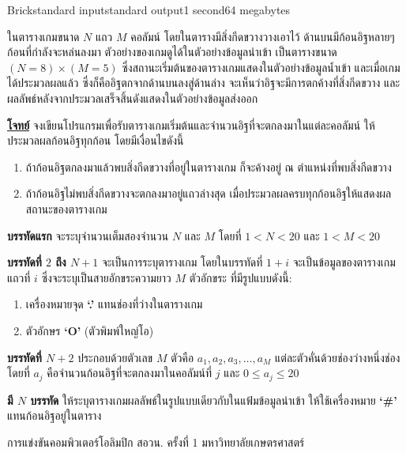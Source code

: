\documentclass[11pt,a4paper]{article}
\begin{document}
\begin{problem}{Brick}{standard input}{standard output}{1 second}{64 megabytes}

ในตารางเกมขนาด $N$ แถว $M$ คอลัมน์ โดยในตารางมีสิ่งกีดขวางวางเอาไว้ ด้านบนมีก้อนอิฐหลายๆ ก้อนที่กำลังจะหล่นลงมา ตัวอย่างของเกมดูได้ในตัวอย่างข้อมูลนำเข้า เป็นตารางขนาด $(N=8)\times (M=5)$ ซึ่งสถานะเริ่มต้นของตารางเกมแสดงในตัวอย่างข้อมูลน้ำเข้า และเมื่อเกมได้ประมวลผลแล้ว ซึ่งก็คืออิฐตกจากด้านบนลงสู่ด้านล่าง จะเห็นว่าอิฐจะมีการตกค้างที่สิ่งกีดขวาง และผลลัพธ์หลังจากประมวลเสร็จสิ้นดังแสดงในตัวอย่างข้อมูลส่งออก


\underline{\textbf{โจทย์}} จงเขียนโปรแกรมเพื่อรับตารางเกมเริ่มต้นและจำนวนอิฐที่จะตกลงมาในแต่ละคอลัมน์ ให้ประมวลผลก้อนอิฐทุกก้อน โดยมีเงื่อนไขดังนี้
\begin{enumerate}
\item  ถ้าก้อนอิฐตกลงมาแล้วพบสิ่งกีดขวางที่อยู่ในตารางเกม ก็จะค้างอยู่ ณ ตำแหน่งที่พบสิ่งกีดขวาง
\item ถ้าก้อนอิฐไม่พบสิ่งกีดขวางจะตกลงมาอยู่แถวล่างสุด เมื่อประมวลผลครบทุกก้อนอิฐให้แสดงผลสถานะของตารางเกม 
\end{enumerate}

\InputFile
\textbf{บรรทัดแรก} จะระบุจำนวนเต็มสองจำนวน $N$ และ $M$ โดยที่ $1 < N < 20$ และ $1 < M < 20$

\textbf{บรรทัดที่ $2$ ถึง $N+1$} จะเป็นการระบุตารางเกม โดยในบรรทัดที่ $1 + i$ จะเป็นข้อมูลของตารางเกมแถวที่ $i$ ซึ่งจะระบุเป็นสายอักขระความยาว $M$ ตัวอักขระ ที่มีรูปแบบดังนี้:
\begin{enumerate}

\item เครื่องหมายจุด \textbf{‘.’} แทนช่องที่ว่างในตารางเกม 
\item ตัวอักษร \textbf{‘O’} (ตัวพิมพ์ใหญ่โอ) 
\end{enumerate}

\textbf{บรรทัดที่ $N+2$} ประกอบด้วยตัวเลข $M$ ตัวคือ $a_1,a_2,a_3,…,a_M$ แต่ละตัวคั่นด้วยช่องว่างหนึ่งช่อง โดยที่ $a_j$ คือจำนวนก้อนอิฐที่จะตกลงมาในคอลัมน์ที่ $j$ และ $0\leq a_j\leq20$

\OutputFile

\textbf{มี $N$ บรรทัด} ให้ระบุตารางเกมผลลัพธ์ในรูปแบบเดียวกับในแฟ้มข้อมูลนำเข้า ให้ใช้เครื่องหมาย \textbf{‘#’} แทนก้อนอิฐอยู่ในตาราง

\Examples

\begin{example}
%
\end{example}

\Source

การแข่งขันคอมพิวเตอร์โอลิมปิก สอวน. ครั้งที่ 1 มหาวิทยาลัยเกษตรศาสตร์

\end{problem}
\end{document}
